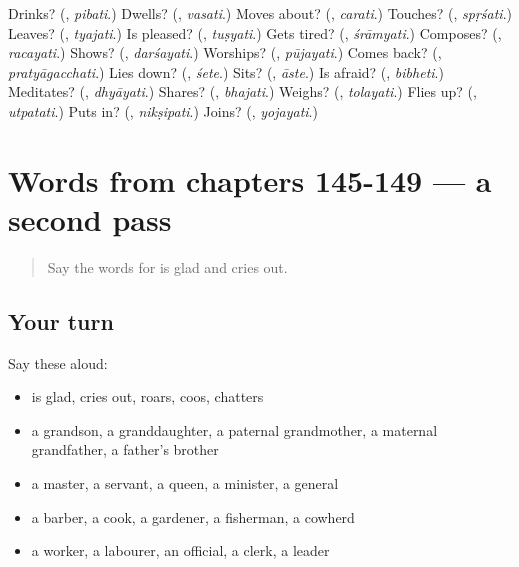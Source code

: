 \begin{tcolorbox}[breakable,colback=teal!4,colframe=teal!35!black,title={Before you move on}]
Drinks? (\textbf{}, \emph{pibati}.) Dwells? (\textbf{}, \emph{vasati}.) Moves about? (\textbf{}, \emph{carati}.) Touches? (\textbf{}, \emph{spṛśati}.) Leaves? (\textbf{}, \emph{tyajati}.) Is pleased? (\textbf{}, \emph{tuṣyati}.) Gets tired? (\textbf{}, \emph{śrāmyati}.) Composes? (\textbf{}, \emph{racayati}.) Shows? (\textbf{}, \emph{darśayati}.) Worships? (\textbf{}, \emph{pūjayati}.) Comes back? (\textbf{}, \emph{pratyāgacchati}.) Lies down? (\textbf{}, \emph{śete}.) Sits? (\textbf{}, \emph{āste}.) Is afraid? (\textbf{}, \emph{bibheti}.) Meditates? (\textbf{}, \emph{dhyāyati}.) Shares? (\textbf{}, \emph{bhajati}.) Weighs? (\textbf{}, \emph{tolayati}.) Flies up? (\textbf{}, \emph{utpatati}.) Puts in? (\textbf{}, \emph{nikṣipati}.) Joins? (\textbf{}, \emph{yojayati}.)
\end{tcolorbox}
\section[(dialogue)]{Words from chapters 145-149 — a second pass}

\label{lesson:SA-R149-second-pass-words-from-chapters-145-149}



\begin{quote}
Say the words for is glad and cries out.
\end{quote}

\subsection*{Your turn}
Say these aloud:

\begin{itemize}
\raggedright
  \item is glad, cries out, roars, coos, chatters
  \item a grandson, a granddaughter, a paternal grandmother, a maternal grandfather, a father's brother
  \item a master, a servant, a queen, a minister, a general
  \item a barber, a cook, a gardener, a fisherman, a cowherd
  \item a worker, a labourer, an official, a clerk, a leader
\end{itemize}

